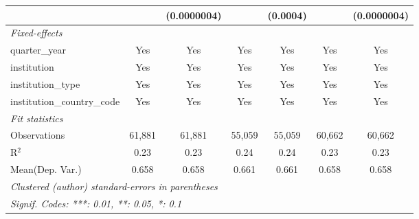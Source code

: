 \begin{tabular}{lcccccc}
                                      &               & (0.0000004)   &               & (0.0004)      &               & (0.0000004)\\   
   \midrule
   \emph{Fixed-effects}\\
   quarter\_year                      & Yes           & Yes           & Yes           & Yes           & Yes           & Yes\\  
   institution                        & Yes           & Yes           & Yes           & Yes           & Yes           & Yes\\  
   institution\_type                  & Yes           & Yes           & Yes           & Yes           & Yes           & Yes\\  
   institution\_country\_code         & Yes           & Yes           & Yes           & Yes           & Yes           & Yes\\  
   \midrule
   \emph{Fit statistics}\\
   Observations                       & 61,881        & 61,881        & 55,059        & 55,059        & 60,662        & 60,662\\  
   R$^2$                              & 0.23          & 0.23          & 0.24          & 0.24          & 0.23          & 0.23\\  
Mean(Dep. Var.) & 0.658 & 0.658 & 0.661 & 0.661 & 0.658 & 0.658 \\
   \midrule \midrule
   \multicolumn{7}{l}{\emph{Clustered (author) standard-errors in parentheses}}\\
   \multicolumn{7}{l}{\emph{Signif. Codes: ***: 0.01, **: 0.05, *: 0.1}}\\
\end{tabular}
\par\endgroup
